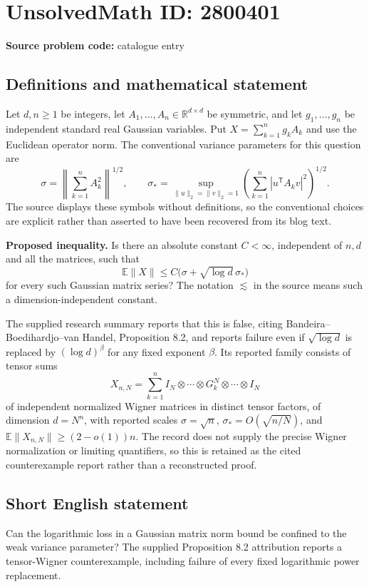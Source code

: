\documentclass[11pt]{article}
\begin{document}
\section*{UnsolvedMath ID: 2800401}
\textbf{Source problem code:} catalogue entry
\subsection{Definitions and mathematical statement}
Let $d,n\geq1$ be integers, let $A_1,\ldots,A_n\in\mathbb R^{d\times d}$ be symmetric, and let $g_1,\ldots,g_n$ be independent standard real Gaussian variables. Put $X=\sum_{k=1}^ng_kA_k$ and use the Euclidean operator norm. The conventional variance parameters for this question are
\[
\sigma=\left\|\sum_{k=1}^n A_k^2\right\|^{1/2},\qquad
\sigma_* =\sup_{\|u\|_2=\|v\|_2=1}
\left(\sum_{k=1}^n|u^{\mathsf T}A_kv|^2\right)^{1/2}.
\]
The source displays these symbols without definitions, so the conventional choices are explicit rather than asserted to have been recovered from its blog text.

\textbf{Proposed inequality.} Is there an absolute constant $C<\infty$, independent of $n,d$ and all the matrices, such that
\[
\mathbb E\|X\|\leq C\big(\sigma+\sqrt{\log d}\,\sigma_*\big)
\]
for every such Gaussian matrix series? The notation $\lesssim$ in the source means such a dimension-independent constant.

The supplied research summary reports that this is false, citing Bandeira--Boedihardjo--van Handel, Proposition 8.2, and reports failure even if $\sqrt{\log d}$ is replaced by $(\log d)^\beta$ for any fixed exponent $\beta$. Its reported family consists of tensor sums
\[
X_{n,N}=\sum_{k=1}^n I_N\otimes\cdots\otimes G_k^N\otimes\cdots\otimes I_N
\]
of independent normalized Wigner matrices in distinct tensor factors, of dimension $d=N^n$, with reported scales $\sigma=\sqrt n$, $\sigma_*=O(\sqrt{n/N})$, and $\mathbb E\|X_{n,N}\|\geq(2-o(1))n$. The record does not supply the precise Wigner normalization or limiting quantifiers, so this is retained as the cited counterexample report rather than a reconstructed proof.
\subsection{Short English statement}
Can the logarithmic loss in a Gaussian matrix norm bound be confined to the weak variance parameter? The supplied Proposition 8.2 attribution reports a tensor-Wigner counterexample, including failure of every fixed logarithmic power replacement.
\end{document}
